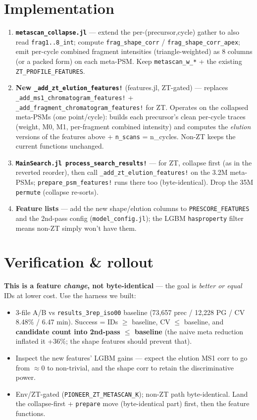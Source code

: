 \documentclass[11pt]{article}
\newcommand{\code}[1]{\texttt{\small #1}}
\begin{document}
\section{Implementation}

\begin{enumerate}
\item \textbf{\code{metascan\_collapse.jl}} --- extend the per-(precursor,cycle) gather
to also read \code{frag1..8\_int}; compute \code{frag\_shape\_corr} /
\code{frag\_shape\_corr\_apex}; emit per-cycle combined fragment intensities
(triangle-weighted) as 8 columns (or a packed form) on each meta-PSM. Keep
\code{metascan\_w\_*} + the existing \code{ZT\_PROFILE\_FEATURES}.
\item \textbf{New \code{\_add\_zt\_elution\_features!}} (features.jl, ZT-gated) ---
replaces \code{\_add\_ms1\_chromatogram\_features!} + \code{\_add\_fragment\_chromatogram\_features!}
for ZT. Operates on the collapsed meta-PSMs (one point/cycle): builds each
precursor's clean per-cycle traces (weight, M0, M1, per-fragment combined intensity)
and computes the \emph{elution} versions of the features above + \code{n\_scans} =
n\_cycles. Non-ZT keeps the current functions unchanged.
\item \textbf{\code{MainSearch.jl process\_search\_results!}} --- for ZT, collapse first
(as in the reverted reorder), then call \code{\_add\_zt\_elution\_features!} on the
3.2M meta-PSMs; \code{prepare\_psm\_features!} runs there too (byte-identical). Drop
the 35M \code{permute} (collapse re-sorts).
\item \textbf{Feature lists} --- add the new shape/elution columns to
\code{PRESCORE\_FEATURES} and the 2nd-pass config (\code{model\_config.jl}); the
LGBM \code{hasproperty} filter means non-ZT simply won't have them.
\end{enumerate}

\section{Verification \& rollout}

\textbf{This is a feature \emph{change}, not byte-identical} --- the goal is
\emph{better or equal} IDs at lower cost. Use the harness we built:
\begin{itemize}
\item 3-file A/B vs \code{results\_3rep\_iso00} baseline (73,657 prec / 12,228 PG /
CV 8.48\% / 6.47 min). Success = IDs $\ge$ baseline, CV $\le$ baseline, and
\textbf{candidate count into 2nd-pass $\le$ baseline} (the naive meta reduction
inflated it +36\%; the shape features should prevent that).
\item Inspect the new features' LGBM gains --- expect the elution MS1 corr to go from
$\approx$0 to non-trivial, and the shape corr to retain the discriminative power.
\item Env/ZT-gated (\code{PIONEER\_ZT\_METASCAN\_K}); non-ZT path byte-identical.
Land the collapse-first + \code{prepare} move (byte-identical part) first, then the
feature functions.
\end{itemize}
\end{document}
